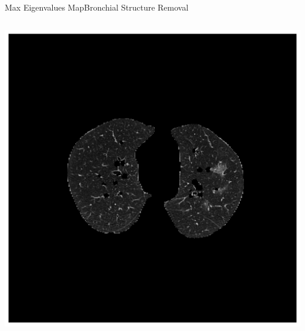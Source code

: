 \documentclass{standalone}
\begin{document}
\begin{frame}[noframenumbering]{Max Eigenvalues Map}{Bronchial Structure Removal}
\begin{columns}[b]
\begin{column}{.4\textwidth}
			\centering\includegraphics[width=.7\linewidth]{./img/NoBr}
		\end{column}
		\end{columns}
	\end{frame}
\end{document}
